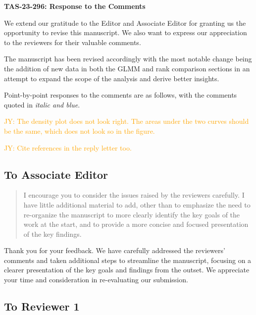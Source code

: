 \documentclass[12pt]{article}
\newcommand{\jy}[1]{\textcolor{orange}{JY: #1}}
\newenvironment{comment}%
{\begin{quotation}\noindent\small\it\color{darkblue}\ignorespaces%
}{\end{quotation}}
\begin{document}
\begin{center}
  {\Large\bf TAS-23-296: Response to the Comments}
\end{center}

We extend our gratitude to the Editor and Associate Editor for 
granting us the opportunity to revise this manuscript. We also want to
express our appreciation to the reviewers for their valuable comments. 


The manuscript has been revised accordingly with the most notable change being 
the addition of new data in both the GLMM and rank comparison sections in an
attempt to expand the scope of the analysis and derive better insights. 


Point-by-point responses to the comments are as follows, with the
comments quoted in \emph{\color{darkblue} italic and blue}.

\jy{The density plot does not look right. The areas under the two
  curves should be the same, which does not look so in the figure.}

\jy{Cite references in the reply letter too.}


\subsection*{To Associate Editor}

\begin{comment}
I encourage you to consider the issues raised by the reviewers carefully. I have
little additional material to add, other than to emphasize the need to
re-organize the manuscript to more clearly identify the key goals of the work at
the start, and to provide a more concise and focused presentation of the key
findings.
\end{comment}

Thank you for your feedback. We have carefully addressed the
reviewers' comments and taken additional steps to streamline the
manuscript, focusing on a clearer presentation of the key goals and
findings from the outset. We appreciate your time and consideration in
re-evaluating our submission.


\subsection*{To Reviewer 1}
\end{document}
